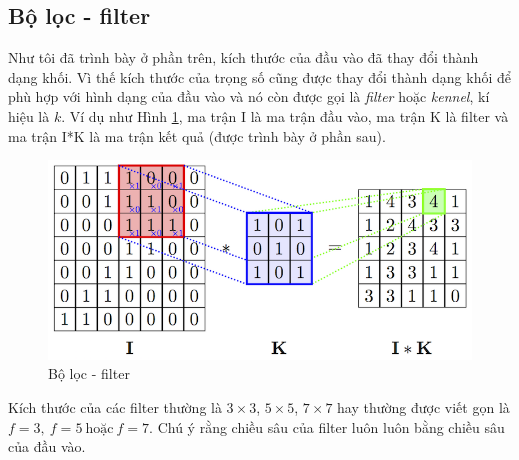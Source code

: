 \subsection{Bộ lọc - filter}
Như tôi đã trình bày ở phần trên, kích thước của đầu vào đã thay đổi thành dạng khối. Vì thế kích thước của trọng số cũng được thay đổi thành dạng khối để phù hợp với hình dạng của đầu vào và nó còn được gọi là \textit{filter} hoặc \textit{kennel}, kí hiệu là $k$.  Ví dụ như Hình \ref{fig:filter}, ma trận I là ma trận đầu vào, ma trận K là filter và ma trận I*K là ma trận kết quả (được trình bày ở phần sau).
\begin{center}
\begin{figure}[htp]
	\begin{center}
		\includegraphics[scale=1.2]{chap4/image/minhHoaTichChap.png}
	\end{center}
	\caption{Bộ lọc - filter}
	\label{fig:filter}
\end{figure}
\end{center}
Kích thước của các filter thường là $3\times3$, $5\times5$, $7\times7$  hay thường được viết gọn là $f=3,~f=5~ \text{hoặc} ~f=7$. Chú ý rằng chiều sâu của filter luôn luôn bằng chiều sâu của đầu vào.

